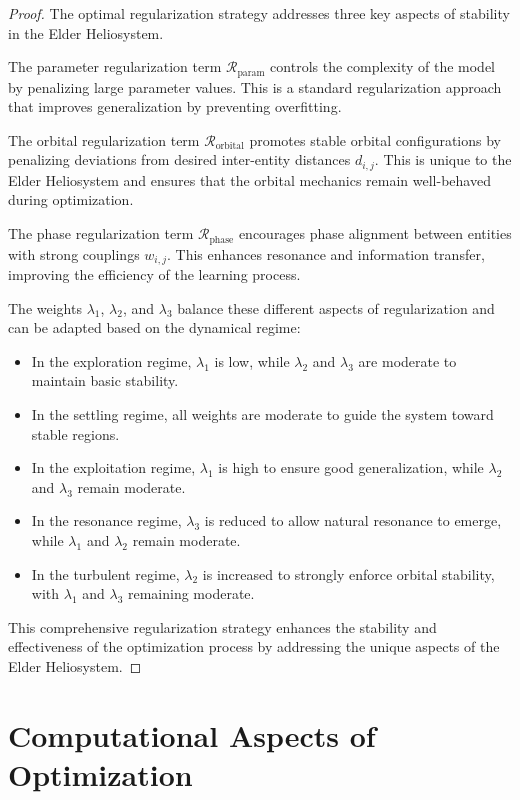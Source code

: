 \begin{proof}
The optimal regularization strategy addresses three key aspects of stability in the Elder Heliosystem.

The parameter regularization term $\mathcal{R}_{\text{param}}$ controls the complexity of the model by penalizing large parameter values. This is a standard regularization approach that improves generalization by preventing overfitting.

The orbital regularization term $\mathcal{R}_{\text{orbital}}$ promotes stable orbital configurations by penalizing deviations from desired inter-entity distances $d_{i,j}$. This is unique to the Elder Heliosystem and ensures that the orbital mechanics remain well-behaved during optimization.

The phase regularization term $\mathcal{R}_{\text{phase}}$ encourages phase alignment between entities with strong couplings $w_{i,j}$. This enhances resonance and information transfer, improving the efficiency of the learning process.

The weights $\lambda_1$, $\lambda_2$, and $\lambda_3$ balance these different aspects of regularization and can be adapted based on the dynamical regime:
\begin{itemize}
    \item In the exploration regime, $\lambda_1$ is low, while $\lambda_2$ and $\lambda_3$ are moderate to maintain basic stability.
    \item In the settling regime, all weights are moderate to guide the system toward stable regions.
    \item In the exploitation regime, $\lambda_1$ is high to ensure good generalization, while $\lambda_2$ and $\lambda_3$ remain moderate.
    \item In the resonance regime, $\lambda_3$ is reduced to allow natural resonance to emerge, while $\lambda_1$ and $\lambda_2$ remain moderate.
    \item In the turbulent regime, $\lambda_2$ is increased to strongly enforce orbital stability, with $\lambda_1$ and $\lambda_3$ remaining moderate.
\end{itemize}

This comprehensive regularization strategy enhances the stability and effectiveness of the optimization process by addressing the unique aspects of the Elder Heliosystem.
\end{proof}

\section{Computational Aspects of Optimization}

